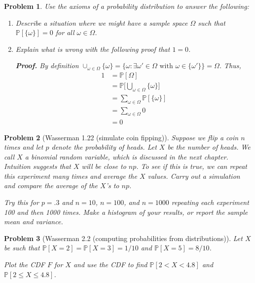 \documentclass{article}
\newtheorem{problem}{Problem}
\newcommand{\PP}{\mathbb{P}}
\begin{document}
\begin{problem}
    Use the axioms of a probability distribution to answer the following:
    \begin{enumerate}[label=(\alph*),topsep=0pt]
        \item Describe a situation where we might have a sample space $\Omega$ such that $\PP[\{\omega\}] = 0$ for all $\omega\in\Omega$.
        \item 
            Explain what is wrong with the following proof that $1=0$.
            
            \textbf{Proof.} By definition $\cup_{\omega \in \Omega} \{\omega\} = \{ \omega : \exists \omega' \in \Omega \text{ with } \omega \in \{\omega' \} \} = \Omega$.
            Thus,
            \begin{align*}
                1 &= \PP[\Omega] \tag{Axiom 2}
                \\&= \PP\bigg[\bigcup_{\omega \in \Omega} \{ \omega\}\bigg]  \tag{definition of union}
                \\&= \sum_{\omega \in \Omega} \PP[\{\omega\} ] \tag{Axiom 3} 
                \\&= \sum_{\omega \in \Omega} 0  \tag{assumption} 
                \\&= 0 \tag*{\qed}
            \end{align*}
    \end{enumerate}
\end{problem}

\begin{problem}[Wasserman 1.22 (simulate coin fipping)]
Suppose we flip a coin $n$ times and let $p$ denote
the probability of heads. Let $X$ be the number of heads. We call $X$
a binomial random variable, which is discussed in the next chapter.
Intuition suggests that $X$ will be close to $np$. To see if this is true, we
can repeat this experiment many times and average the $X$ values. Carry
out a simulation and compare the average of the $X$'s to $np$. 

Try this for
$p =.3$ and $n = 10$, $n = 100$, and $n = 1000$ repeating each experiment 100 and then 1000 times.
Make a histogram of your results, or report the sample mean and variance.
\end{problem}

\begin{problem}[Wasserman 2.2 (computing probabilities from distributions)]
    Let $X$ be such that $\PP[X=2] = \PP[X=3] = 1/10$ and $\PP[X=5] = 8/10$.

    Plot the CDF $F$ for $X$ and use the CDF to find $\PP[2<X<4.8]$ and $\PP[2\leq X\leq 4.8]$.

\end{problem}
\end{document}
